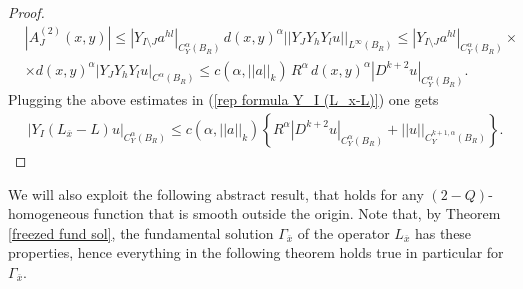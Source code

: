 \documentclass{article}
\numberwithin{equation}{section}
\begin{document}
\begin{proof}
    \begin{align*}
        & |A_{J}^{(2)}(x,y)| \leq |Y_{I \setminus J} a^{hl}|_{C^{\alpha}_Y(B_R)} \, d(x,y)^{\alpha} ||Y_{J} Y_h Y_l u||_{L^{\infty}(B_R)} \leq |Y_{I \setminus J} a^{hl}|_{C^{\alpha}_Y(B_R)} \times \\
        & \times d(x,y)^{\alpha} |Y_{J} Y_h Y_l u|_{C^{\alpha}(B_R)} \leq c(\alpha, ||a||_k) \, R^{\alpha} \, d(x,y)^{\alpha} |D^{k+2} u|_{C^{\alpha}_Y(B_R)}.
    \end{align*}
    Plugging the above estimates in (\ref{rep formula Y_I (L_x-L)}) one gets
    \begin{align*}
        & |Y_I (L_{\overline{x}}-L) u|_{C^{\alpha}_Y(B_R)} \leq c(\alpha, ||a||_k) \left\{ R^{\alpha} |D^{k+2} u|_{C^{\alpha}_Y(B_R)} + ||u||_{C^{k+1,\alpha}_Y(B_R)}\right\}.
    \end{align*}
\end{proof}

\vspace{2mm}

\hspace{-7mm} We will also exploit the following abstract result, that holds for any $(2-Q)$-homogeneous function that is smooth outside the origin. Note that, by Theorem \ref{freezed fund sol}, the fundamental solution $\Gamma_{\overline{x}}$ of the operator $L_{\overline{x}}$ has these properties, hence everything in the following theorem holds true in particular for $\Gamma_{\overline{x}}$.

\vspace{2mm}
\end{document}
